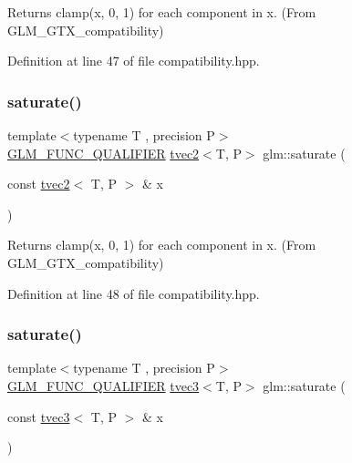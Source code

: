 Returns clamp(x, 0, 1) for each component in x. (From G\+L\+M\+\_\+\+G\+T\+X\+\_\+compatibility) 



Definition at line 47 of file compatibility.\+hpp.

\mbox{\label{group__gtx__compatibility_ga5815a26488231dfdf92242cf0c2d2107}} 
\subsubsection{\texorpdfstring{saturate()}{saturate()}\hspace{0.1cm}{\footnotesize\ttfamily [2/4]}}
{\footnotesize\ttfamily template$<$typename T , precision P$>$ \\
\mbox{\hyperlink{setup_8hpp_a33fdea6f91c5f834105f7415e2a64407}{G\+L\+M\+\_\+\+F\+U\+N\+C\+\_\+\+Q\+U\+A\+L\+I\+F\+I\+ER}} \mbox{\hyperlink{structglm_1_1tvec2}{tvec2}}$<$T, P$>$ glm\+::saturate (\begin{DoxyParamCaption}\item[{const \mbox{\hyperlink{structglm_1_1tvec2}{tvec2}}$<$ T, P $>$ \&}]{x }\end{DoxyParamCaption})}



Returns clamp(x, 0, 1) for each component in x. (From G\+L\+M\+\_\+\+G\+T\+X\+\_\+compatibility) 



Definition at line 48 of file compatibility.\+hpp.

\mbox{\label{group__gtx__compatibility_ga02ed1a53c6df104d56b69f8fb5e9af1b}} 
\subsubsection{\texorpdfstring{saturate()}{saturate()}\hspace{0.1cm}{\footnotesize\ttfamily [3/4]}}
{\footnotesize\ttfamily template$<$typename T , precision P$>$ \\
\mbox{\hyperlink{setup_8hpp_a33fdea6f91c5f834105f7415e2a64407}{G\+L\+M\+\_\+\+F\+U\+N\+C\+\_\+\+Q\+U\+A\+L\+I\+F\+I\+ER}} \mbox{\hyperlink{structglm_1_1tvec3}{tvec3}}$<$T, P$>$ glm\+::saturate (\begin{DoxyParamCaption}\item[{const \mbox{\hyperlink{structglm_1_1tvec3}{tvec3}}$<$ T, P $>$ \&}]{x }\end{DoxyParamCaption})}



